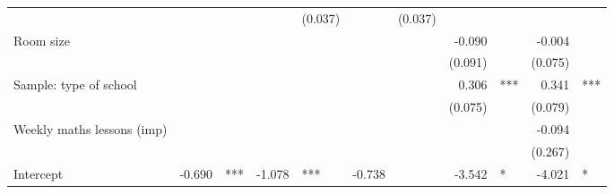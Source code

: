 \documentclass{article}
\begin{document}
\begin{table}[!h]
\begin{tabular}{lllllllllll}
  \multicolumn{1}{r}{} &
  \multicolumn{1}{l}{} &
  \multicolumn{1}{r}{} &
  \multicolumn{1}{l}{} &
  \multicolumn{1}{r}{(0.037)} &
  \multicolumn{1}{l}{} &
  \multicolumn{1}{r}{(0.037)} &
  \multicolumn{1}{l}{} \\
\multicolumn{1}{l}{Room size} &
  \multicolumn{1}{r}{} &
  \multicolumn{1}{l}{} &
  \multicolumn{1}{r}{} &
  \multicolumn{1}{l}{} &
  \multicolumn{1}{r}{} &
  \multicolumn{1}{l}{} &
  \multicolumn{1}{r}{-0.090} &
  \multicolumn{1}{l}{} &
  \multicolumn{1}{r}{-0.004} &
  \multicolumn{1}{l}{} \\
\multicolumn{1}{l}{} &
  \multicolumn{1}{r}{} &
  \multicolumn{1}{l}{} &
  \multicolumn{1}{r}{} &
  \multicolumn{1}{l}{} &
  \multicolumn{1}{r}{} &
  \multicolumn{1}{l}{} &
  \multicolumn{1}{r}{(0.091)} &
  \multicolumn{1}{l}{} &
  \multicolumn{1}{r}{(0.075)} &
  \multicolumn{1}{l}{} \\
\multicolumn{1}{l}{Sample: type of school} &
  \multicolumn{1}{r}{} &
  \multicolumn{1}{l}{} &
  \multicolumn{1}{r}{} &
  \multicolumn{1}{l}{} &
  \multicolumn{1}{r}{} &
  \multicolumn{1}{l}{} &
  \multicolumn{1}{r}{0.306} &
  \multicolumn{1}{l}{***} &
  \multicolumn{1}{r}{0.341} &
  \multicolumn{1}{l}{***} \\
\multicolumn{1}{l}{} &
  \multicolumn{1}{r}{} &
  \multicolumn{1}{l}{} &
  \multicolumn{1}{r}{} &
  \multicolumn{1}{l}{} &
  \multicolumn{1}{r}{} &
  \multicolumn{1}{l}{} &
  \multicolumn{1}{r}{(0.075)} &
  \multicolumn{1}{l}{} &
  \multicolumn{1}{r}{(0.079)} &
  \multicolumn{1}{l}{} \\
\multicolumn{1}{l}{Weekly maths lessons (imp)} &
  \multicolumn{1}{r}{} &
  \multicolumn{1}{l}{} &
  \multicolumn{1}{r}{} &
  \multicolumn{1}{l}{} &
  \multicolumn{1}{r}{} &
  \multicolumn{1}{l}{} &
  \multicolumn{1}{r}{} &
  \multicolumn{1}{l}{} &
  \multicolumn{1}{r}{-0.094} &
  \multicolumn{1}{l}{} \\
\multicolumn{1}{l}{} &
  \multicolumn{1}{r}{} &
  \multicolumn{1}{l}{} &
  \multicolumn{1}{r}{} &
  \multicolumn{1}{l}{} &
  \multicolumn{1}{r}{} &
  \multicolumn{1}{l}{} &
  \multicolumn{1}{r}{} &
  \multicolumn{1}{l}{} &
  \multicolumn{1}{r}{(0.267)} &
  \multicolumn{1}{l}{} \\
\multicolumn{1}{l}{Intercept} &
  \multicolumn{1}{r}{-0.690} &
  \multicolumn{1}{l}{***} &
  \multicolumn{1}{r}{-1.078} &
  \multicolumn{1}{l}{***} &
  \multicolumn{1}{r}{-0.738} &
  \multicolumn{1}{l}{} &
  \multicolumn{1}{r}{-3.542} &
  \multicolumn{1}{l}{*} &
  \multicolumn{1}{r}{-4.021} &
  \multicolumn{1}{l}{*} \\

\end{tabular}
\end{table}
\end{document}
